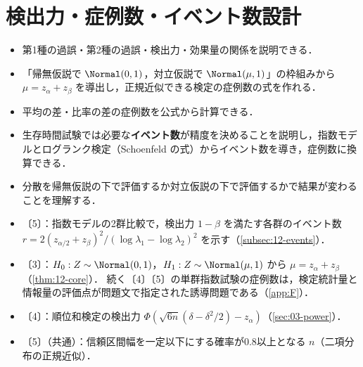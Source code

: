 \chapter{検出力・症例数・イベント数設計}\label{ch:12}

\begin{goalbox}
\begin{itemize}
\item 第1種の過誤・第2種の過誤・検出力・効果量の関係を説明できる．
\item 「帰無仮説で $\Normal(0,1)$，対立仮説で $\Normal(\mu,1)$」の枠組みから $\mu=z_\alpha+z_\beta$ を導出し，正規近似できる検定の症例数の式を作れる．
\item 平均の差・比率の差の症例数を公式から計算できる．
\item 生存時間試験では必要な\textbf{イベント数}が精度を決めることを説明し，指数モデルとログランク検定（Schoenfeld の式）からイベント数を導き，症例数に換算できる．
\item 分散を帰無仮説の下で評価するか対立仮説の下で評価するかで結果が変わることを理解する．
\end{itemize}
\end{goalbox}

\begin{exambox}
\begin{itemize}
\item {}〔5〕：指数モデルの2群比較で，検出力 $1-\beta$ を満たす各群のイベント数 $r=2(z_{\alpha/2}+z_\beta)^2/(\log\lambda_1-\log\lambda_2)^2$ を示す（\cref{subsec:12-events}）．
\item {}〔3〕：$H_0:Z\sim\Normal(0,1)$，$H_1:Z\sim\Normal(\mu,1)$ から $\mu=z_\alpha+z_\beta$（\cref{thm:12-core}）．
      続く〔4〕〔5〕の単群指数試験の症例数は，検定統計量と情報量の評価点が問題文で指定された誘導問題である（\cref{app:F}）．
\item {}〔4〕：順位和検定の検出力 $\Phi(\sqrt{6n}(\delta-\delta^2/2)-z_\alpha)$（\cref{sec:03-power}）．
\item {}〔5〕（共通）：信頼区間幅を一定以下にする確率が0.8以上となる $n$（二項分布の正規近似）．
\end{itemize}
\end{exambox}


